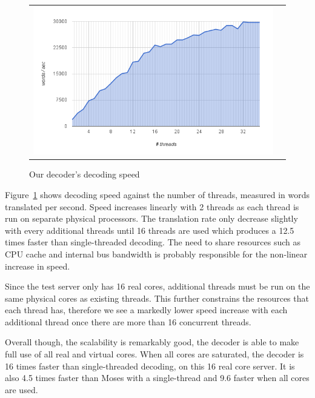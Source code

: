 \documentclass[11pt]{article}
\begin{document}
\begin{figure}[h]
\centering
\begin{tabular}{cc}
{\includegraphics[scale=0.4]{scalability.png}} 
\end{tabular}
\caption{Our decoder's decoding speed}
\label{fig:speed}
\end{figure} 

Figure~\ref{fig:speed} shows decoding speed against the number of threads, measured in words translated per second. Speed increases linearly with 2 threads as each thread is run on separate physical processors. The translation rate only decrease slightly with every additional threads until 16 threads are used which produces a 12.5 times faster than single-threaded decoding. The need to share resources such as CPU cache and internal bus bandwidth is probably responsible for the non-linear increase in speed.

Since the test server only has 16 real cores, additional threads must be run on the same physical cores as existing threads. This further constrains the resources that each thread has, therefore we see a markedly lower speed increase with each additional thread once there are more than 16 concurrent threads.

Overall though, the scalability is remarkably good, the decoder is able to make full use of all real and virtual cores. When all cores are saturated, the decoder is 16 times faster than single-threaded decoding, on this 16 real core server. It is also 4.5 times faster than Moses with a single-thread and 9.6 faster when all cores are used.
\end{document}
